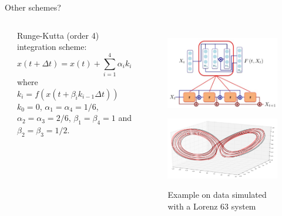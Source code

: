 \documentclass[handout]{beamer}
\newcommand{\rref}[1][]{\hfill{\scriptsize\textit{#1}}}
\begin{document}
\begin{frame}{Other schemes?}
\begin{columns}
\rref[\cite{Fablet2017}]

Runge-Kutta (order 4) integration scheme:
$$
x(t+\Delta t) = x(t) + \sum_{i=1}^4 \alpha_i k_i
$$
where $k_i = f(x(t+\beta_i k_{i-1}\Delta t))$\\
$k_0=0$, 
$\alpha_1=\alpha_4=1/6$,
$\alpha_2=\alpha_3=2/6$,
$\beta_1=\beta_4=1$ 
and  $\beta_2=\beta_3=1/2$.
\pause
{}
\begin{figure}
    \centering
    \includegraphics[width=\textwidth]{fig/L3/rk-resnet.png}\\
    \pause
      \caption*{Example on data simulated with a Lorenz 63 system}
     \includegraphics[width=\textwidth]{fig/L3/result-resnet.png}\\
   
\end{figure}
\end{columns}
\end{frame}
\end{document}
